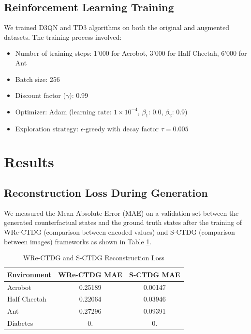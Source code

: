\subsection{Reinforcement Learning Training}

We trained D3QN and TD3 algorithms on both the original and augmented datasets.
The training process involved:

\begin{itemize}
    \item Number of training steps: 1'000 for Acrobot, 3'000 for Half Cheetah, 6'000 for Ant
    \item Batch size: 256
    \item Discount factor ($\gamma$): 0.99
    \item Optimizer: Adam (learning rate: $1\times 10^{-4}$, $\beta_1$: 0.0, $\beta_2$: 0.9)
    \item Exploration strategy: $\epsilon$-greedy with decay factor $\tau = 0.005$
\end{itemize}

\section{Results}

\subsection{Reconstruction Loss During Generation}

We measured the Mean Absolute Error (MAE) on a validation set
between the generated counterfactual states and the ground truth
states after the training of WRe-CTDG (comparison between encoded values)
and S-CTDG (comparison between images) frameworks
as shown in Table \ref{tab:mae}.

\begin{table}[h]
\centering
\begin{tabular}{@{}lcc@{}}
    \toprule
    \textbf{Environment} & \textbf{WRe-CTDG MAE} & \textbf{S-CTDG MAE} \\ \midrule
    Acrobot              & 0.25189               & 0.00147             \\
    Half Cheetah         & 0.22064               & 0.03946             \\
    Ant                  & 0.27296               & 0.09391             \\
    Diabetes             & 0.                    & 0.                  \\ \bottomrule
    \end{tabular}
\caption{WRe-CTDG and S-CTDG Reconstruction Loss}
\label{tab:mae}
\end{table}

